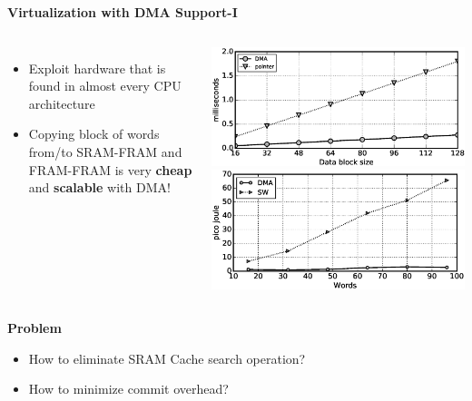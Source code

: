\begin{frame}{\textbf{Virtualization with DMA Support-I}}
	\begin{columns}		
		
		\begin{itemize}
			\item Exploit hardware that is found in almost every CPU architecture
			\item Copying block of words from/to SRAM-FRAM and FRAM-FRAM is very \textbf{cheap} and \textbf{scalable} with DMA!
		\end{itemize}
		
		
		\includegraphics[scale=0.25]{images/dmaSize.eps}\\			
		\includegraphics[scale=0.25]{images/energyConsumptionDMA_SW.eps}	
	\end{columns}
	
	
	\begin{alertblock}{\textbf{Problem}}
		\begin{itemize}
			\item How to eliminate SRAM Cache search operation? 
			\item How to minimize commit overhead?
		\end{itemize}	
	\end{alertblock}
	
	
\end{frame}


